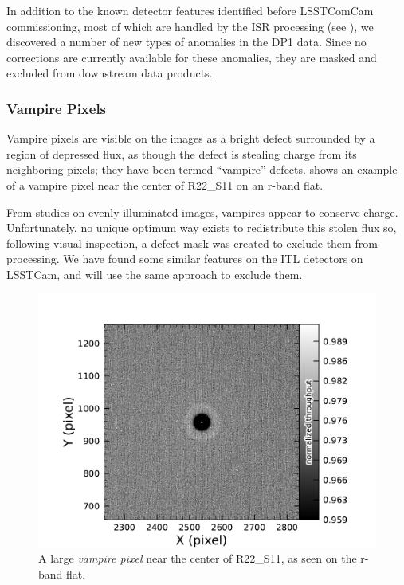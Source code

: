 In addition to the known detector features identified before LSSTComCam commissioning, most of which are handled by the ISR processing (see ), we discovered a number of new types of anomalies in the DP1 data. 
Since no corrections are currently available for these anomalies, they are masked and excluded from downstream data products.

\subsubsection{Vampire Pixels}
Vampire pixels are visible on the images as a bright defect surrounded by a region of depressed flux, as though the defect is stealing charge from its neighboring pixels; they have been termed ``vampire'' defects.
 shows an example of a vampire pixel near the center of R22\_S11 on an r-band flat.

From studies on evenly illuminated images, vampires appear to conserve charge.
Unfortunately, no unique optimum way exists to redistribute this stolen flux so, following visual inspection, a defect mask was created to exclude them from processing.
We have found some similar features on the ITL detectors on LSSTCam, and will use the same approach to exclude them.
\begin{figure}[htb!]
  \centering
  \includegraphics[width=0.98\linewidth]{dp1_isr_anomalies-vampire_pixel}
  \caption{A large \textit{vampire pixel} near the center of R22\_S11, as seen on the r-band flat.}
   \label{fig:anomalies_vampire_pixels}
\end{figure}

